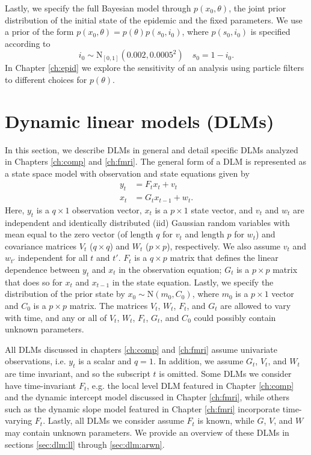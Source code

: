 Lastly, we specify the full Bayesian model through $p(x_0, \theta)$, the joint prior distribution of the initial state of the epidemic and the fixed parameters. We use a prior of the form $p(x_0,\theta) = p(\theta)p(s_0,i_0)$, where $p(s_0,i_0)$ is specified according to
\begin{equation}
i_0 \sim \mbox{N}_{[0,1]}(0.002,0.0005^2) \quad s_0 = 1 - i_0. \label{eqn:epid:prior:state}
\end{equation}
In Chapter \ref{ch:epid} we explore the sensitivity of an analysis using particle filters to different choices for $p(\theta)$.

\section{Dynamic linear models (DLMs) \label{sec:dlm}}

In this section, we describe DLMs in general and detail specific DLMs analyzed in Chapters \ref{ch:comp} and \ref{ch:fmri}. The general form of a DLM is represented as a state space model with observation and state equations given by
\begin{align}
y_t &= F_tx_t + v_t \label{eqn:dlm:obs} \\
x_t &= G_tx_{t-1} + w_t. \label{eqn:dlm:state}
\end{align}
Here, $y_t$ is a $q \times 1$ observation vector, $x_t$ is a $p \times 1$ state vector, and $v_t$ and $w_t$ are independent and identically distributed (iid) Gaussian random variables with mean equal to the zero vector (of length $q$ for $v_t$ and length $p$ for $w_t$) and covariance matrices $V_t$ ($q \times q$) and $W_t$ ($p \times p$), respectively. We also assume $v_t$ and $w_{t'}$ independent for all $t$ and $t'$. $F_t$ is a $q \times p$ matrix that defines the linear dependence between $y_t$ and $x_t$ in the observation equation; $G_t$ is a $p \times p$ matrix that does so for $x_t$ and $x_{t-1}$ in the state equation. Lastly, we specify the distribution of the prior state by $x_0 \sim \mbox{N}(m_0, C_0)$, where $m_0$ is a $p \times 1$ vector and $C_0$ is a $p \times p$ matrix. The matrices $V_t$, $W_t$, $F_t$, and $G_t$ are allowed to vary with time, and any or all of $V_t$, $W_t$, $F_t$, $G_t$, and $C_0$ could possibly contain unknown parameters.

All DLMs discussed in chapters \ref{ch:comp} and \ref{ch:fmri} assume univariate observations, i.e. $y_t$ is a scalar and $q = 1$. In addition, we assume $G_t$, $V_t$, and $W_t$ are time invariant, and so the subscript $t$ is omitted. Some DLMs we consider have time-invariant $F_t$, e.g. the local level DLM featured in Chapter \ref{ch:comp} and the dynamic intercept model discussed in Chapter \ref{ch:fmri}, while others such as the dynamic slope model featured in Chapter \ref{ch:fmri} incorporate time-varying $F_t$. Lastly, all DLMs we consider assume $F_t$ is known, while $G$, $V$, and $W$ may contain unknown parameters. We provide an overview of these DLMs in sections \ref{sec:dlm:ll} through \ref{sec:dlm:arwn}.

